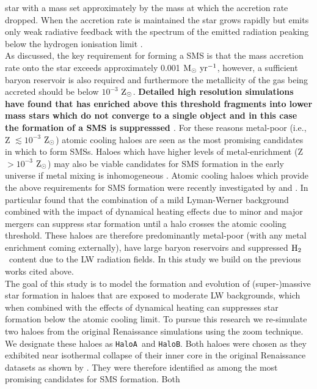 \documentclass[twocolumn,iop,revtex4]{openjournal}
\newcommand{\msolaryrc} {$\rm{M_{\odot}~yr^{-1}}$}
\newcommand{\zsolarc} {$\rm{Z_{\odot}}$}
\newcommand{\molH} {$\rm{H_2}$~}
\newcommand{\ha} {\texttt{HaloA~}}
\newcommand{\hbc} {\texttt{HaloB}}
\begin{document}
star with a mass set approximately by the mass at which the accretion rate dropped.
When the accretion rate is maintained the star grows rapidly but emits
only weak radiative feedback with the spectrum of the emitted radiation peaking below
the hydrogen ionisation limit \citep{Woods_2018}. \\
\indent As discussed, the key requirement for
forming a SMS is that the mass accretion rate onto the star exceeds approximately 0.001 \msolaryrc,
however, a sufficient baryon reservoir is also required and furthermore the metallicity of the gas
being accreted should be below $10^{-3}$ \zsolarc. \textbf{Detailed high resolution simulations have found that has enriched above this threshold fragments into lower mass stars which do not converge to a single object and in this case the formation of a SMS is suppresssed \citep[e.g.][]{Chon_2020}}. For these reasons
metal-poor (i.e., Z $\lesssim 10^{-3}$ \zsolarc) atomic cooling haloes are seen as the most 
promising candidates in which to form SMSs. Haloes which have higher levels of 
metal-enrichment (Z $> 10^{-3}$ \zsolarc) may also be viable candidates for 
SMS formation in the early universe if metal mixing is inhomogeneous \citep{Regan_2020a}. Atomic cooling
haloes which provide the above requirements for SMS formation were recently investigated by \cite{Wise_2019}
and \cite{Regan_2020}. In particular \cite{Wise_2019} found that the combination 
of a mild Lyman-Werner background combined with the impact of dynamical heating effects due to
minor and major mergers can suppress star formation until a halo crosses the atomic cooling threshold.
These haloes are therefore predominantly metal-poor (with any metal enrichment coming externally), have large 
baryon reservoirs and suppressed \molH content due to the LW radiation fields. 
In this study we build on the previous works cited above. \\
\indent The goal of this study is to model the formation and evolution of (super-)massive star
formation in haloes that are exposed to moderate LW backgrounds, which when combined with
the effects of dynamical heating can suppresses star formation below the atomic cooling limit.
  To pursue this research we re-simulate
  two haloes from the original Renaissance simulations using the zoom technique.
  We designate
  these haloes as \ha and \hbc. Both haloes were chosen as they exhibited near isothermal
  collapse of their inner core in the original Renaissance datasets as shown by \cite{Regan_2020}.
  They were therefore identified as among the most promising candidates for SMS formation. Both
\end{document}
